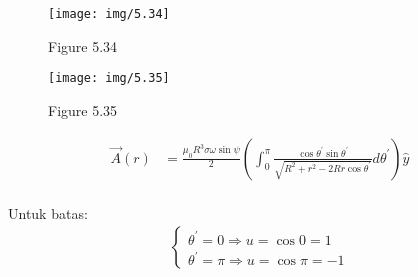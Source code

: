 \begin{figure}[h]
    \centering
    \begin{minipage}{.5\textwidth}
        \centering
        \texttt{[image: img/5.34]}
        \caption*{Figure 5.34}
        \label{fig:5.34}
    \end{minipage}%
    \begin{minipage}{.5\textwidth}
        \centering
        \texttt{[image: img/5.35]}
        \caption*{Figure 5.35}
        \label{fig:5.35}
    \end{minipage}
\end{figure}

 \begin{minipage}{.7\textwidth}
        \centering
        \begin{align*}
            \vec{A}(r) &=\frac{\mu_0 R^3 \sigma \omega \sin \psi}{2}\left(\int_0^\pi \frac{\cos \theta^{\prime} \sin \theta^{\prime}}{\sqrt{R^2+r^2-2 R r \cos \theta^{\prime}}} d \theta^{\prime}\right) \hat{{y}}\\
        \end{align*}
    \end{minipage}%
    \vline 
    \small
    \begin{minipage}{.3\textwidth}
        \hspace{0.1in}
        {Untuk batas:}
        \fontsize{10pt}{12pt}\selectfont
        \begin{gather*}
            \begin{cases}
                \theta^{\prime}=0 \Rightarrow u =\cos 0 = 1\\
                \theta^{\prime}=\pi \Rightarrow u =\cos \pi = -1
            \end{cases}
        \end{gather*}
    \end{minipage}

